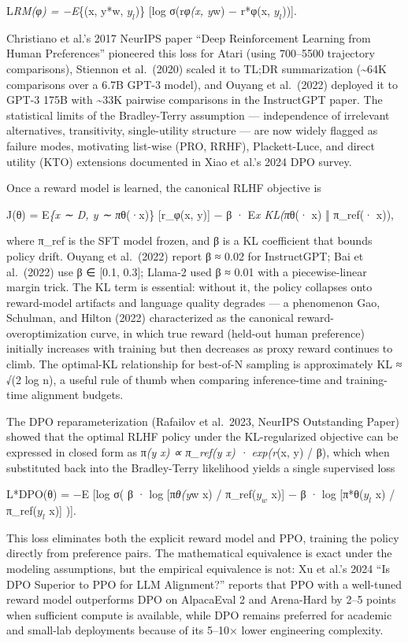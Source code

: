 \documentclass{article}
\begin{document}
L\emph{RM(φ) = −E}\{(x, y*w, \(y_l\))\} {[}log σ(r\emph{φ(x, y}w) − r*φ(x, \(y_l\))){]}.

Christiano et al.'s 2017 NeurIPS paper ``Deep Reinforcement Learning from Human Preferences'' pioneered this loss for Atari (using 700--5500 trajectory comparisons), Stiennon et al.~(2020) scaled it to TL;DR summarization (\textasciitilde64K comparisons over a 6.7B GPT-3 model), and Ouyang et al.~(2022) deployed it to GPT-3 175B with \textasciitilde33K pairwise comparisons in the InstructGPT paper. The statistical limits of the Bradley-Terry assumption --- independence of irrelevant alternatives, transitivity, single-utility structure --- are now widely flagged as failure modes, motivating list-wise (PRO, RRHF), Plackett-Luce, and direct utility (KTO) extensions documented in Xiao et al.'s 2024 DPO survey.

Once a reward model is learned, the canonical RLHF objective is

J(θ) = E\emph{\{x ∼ D, y ∼ π}θ(·\textbar x)\} {[}r\_φ(x, y){]} − β · E\emph{x KL(π}θ(· \textbar{} x) ‖ π\_ref(· \textbar{} x)),

where π\_ref is the SFT model frozen, and β is a KL coefficient that bounds policy drift. Ouyang et al.~(2022) report β ≈ 0.02 for InstructGPT; Bai et al.~(2022) use β ∈ {[}0.1, 0.3{]}; Llama-2 used β ≈ 0.01 with a piecewise-linear margin trick. The KL term is essential: without it, the policy collapses onto reward-model artifacts and language quality degrades --- a phenomenon Gao, Schulman, and Hilton (2022) characterized as the canonical reward-overoptimization curve, in which true reward (held-out human preference) initially increases with training but then decreases as proxy reward continues to climb. The optimal-KL relationship for best-of-N sampling is approximately KL ≈ √(2 log n), a useful rule of thumb when comparing inference-time and training-time alignment budgets.

The DPO reparameterization (Rafailov et al.~2023, NeurIPS Outstanding Paper) showed that the optimal RLHF policy under the KL-regularized objective can be expressed in closed form as π\emph{(y \textbar{} x) ∝ π\_ref(y \textbar{} x) · exp(r}(x, y) / β), which when substituted back into the Bradley-Terry likelihood yields a single supervised loss

L*DPO(θ) = −E {[}log σ( β · log {[}π\emph{θ(y}w \textbar{} x) / π\_ref(\(y_w\) \textbar{} x){]} − β · log {[}π*θ(\(y_l\) \textbar{} x) / π\_ref(\(y_l\) \textbar{} x){]} ){]}.

This loss eliminates both the explicit reward model and PPO, training the policy directly from preference pairs. The mathematical equivalence is exact under the modeling assumptions, but the empirical equivalence is not: Xu et al.'s 2024 ``Is DPO Superior to PPO for LLM Alignment?'' reports that PPO with a well-tuned reward model outperforms DPO on AlpacaEval 2 and Arena-Hard by 2--5 points when sufficient compute is available, while DPO remains preferred for academic and small-lab deployments because of its 5--10× lower engineering complexity.
\end{document}
